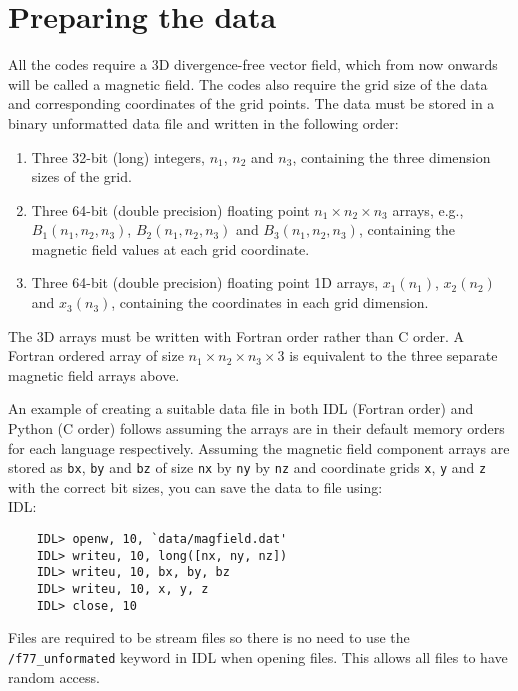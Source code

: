\documentclass[12pt]{article}
\begin{document}
  \section{Preparing the data}
    \label{sec:prep_data}

    All the codes require a 3D divergence-free vector field, which from now onwards will be called a magnetic field. The codes also require the grid size of the data and corresponding coordinates of the grid points. The data must be stored in a binary unformatted data file and written in the following order:
    \begin{enumerate}
      \item Three 32-bit (long) integers, \( n_1 \), \( n_2 \) and \( n_3 \), containing the three dimension sizes of the grid.
      \item Three 64-bit (double precision) floating point \( n_1 \times n_2 \times n_3 \) arrays, e.g., \( B_1(n_1,n_2,n_3) \), \( B_2(n_1,n_2,n_3) \) and \( B_3(n_1,n_2,n_3) \), containing the magnetic field values at each grid coordinate.
      \item Three 64-bit (double precision) floating point 1D arrays, \( x_1(n_1) \), \( x_2(n_2) \) and \( x_3(n_3) \), containing the coordinates in each grid dimension.
    \end{enumerate}
    The 3D arrays must be written with Fortran order rather than C order. A Fortran ordered array of size \( n_1 \times n_2 \times n_3 \times 3 \) is equivalent to the three separate magnetic field arrays above.

    An example of creating a suitable data file in both IDL (Fortran order) and Python (C order) follows assuming the arrays are in their default memory orders for each language respectively. Assuming the magnetic field component arrays are stored as \texttt{bx}, \texttt{by} and \texttt{bz} of size \texttt{nx} by \texttt{ny} by \texttt{nz} and coordinate grids \texttt{x}, \texttt{y} and \texttt{z} with the correct bit sizes, you can save the data to file using:\\

    IDL:

    \begin{verbatim}
    IDL> openw, 10, `data/magfield.dat'
    IDL> writeu, 10, long([nx, ny, nz])
    IDL> writeu, 10, bx, by, bz
    IDL> writeu, 10, x, y, z
    IDL> close, 10
    \end{verbatim}

    Files are required to be stream files so there is no need to use the \texttt{/f77\_unformated} keyword in IDL when opening files. This allows all files to have random access.
\end{document}

